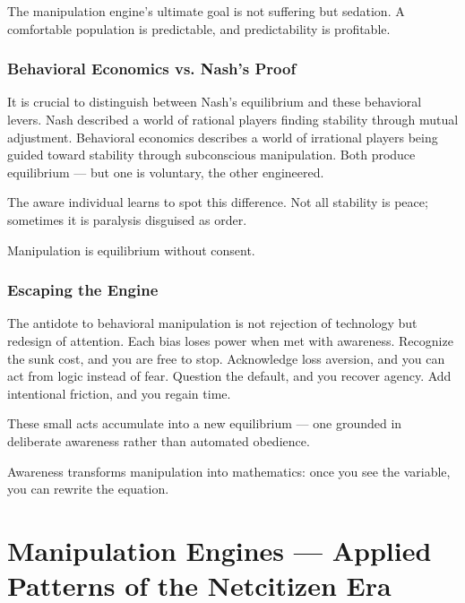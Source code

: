 \documentclass[12pt,twoside]{book}
\begin{document}
The manipulation engine’s ultimate goal is not suffering but sedation.  
A comfortable population is predictable, and predictability is profitable.

\subsection*{Behavioral Economics vs. Nash’s Proof}

It is crucial to distinguish between Nash’s equilibrium and these behavioral levers.  
Nash described a world of rational players finding stability through mutual adjustment.  
Behavioral economics describes a world of irrational players being guided toward stability through subconscious manipulation.  
Both produce equilibrium --- but one is voluntary, the other engineered.  

The aware individual learns to spot this difference.  
Not all stability is peace; sometimes it is paralysis disguised as order.  \\

\begin{keyidea}
Manipulation is equilibrium without consent.
\end{keyidea}

\subsection*{Escaping the Engine}

The antidote to behavioral manipulation is not rejection of technology but redesign of attention.  
Each bias loses power when met with awareness.  
Recognize the sunk cost, and you are free to stop.  
Acknowledge loss aversion, and you can act from logic instead of fear.  
Question the default, and you recover agency.  
Add intentional friction, and you regain time.  

These small acts accumulate into a new equilibrium --- one grounded in deliberate awareness rather than automated obedience. \\

\begin{keyidea}
Awareness transforms manipulation into mathematics: once you see the variable, you can rewrite the equation.
\end{keyidea}

\chapter{Manipulation Engines — Applied Patterns of the Netcitizen Era}
\end{document}
